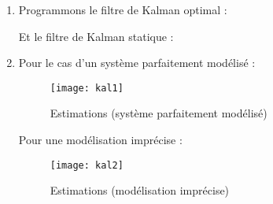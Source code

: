\documentclass[12pt,a4paper,titlepage]{article}
\begin{document}
\begin{enumerate}
    \item{Programmons le filtre de Kalman optimal :

    

    Et le filtre de Kalman statique :

    
        }

    \item{Pour le cas d'un système parfaitement modélisé :

            \begin{figure}[H]
                \caption{Estimations (système parfaitement modélisé)}
                \texttt{[image: kal1]}
                \centering
            \end{figure}

            Pour une modélisation imprécise :

            \begin{figure}[H]
                \caption{Estimations (modélisation imprécise)}
                \texttt{[image: kal2]}
                \centering
            \end{figure}
        }

\end{enumerate}

\begin{enumerate}

\end{enumerate}
\end{document}
